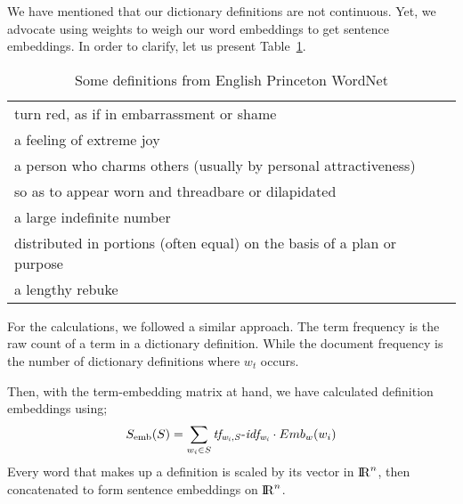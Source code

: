 We have mentioned that our dictionary definitions are not continuous.
Yet, we advocate using \tfidf{} weights to weigh our word embeddings to get sentence embeddings.
In order to clarify, let us present Table~\ref{tab:en_it_examples}.

\noindent{}%

\begin{table}
    \centering
    \caption{Some definitions from English Princeton WordNet}%
    \label{tab:en_it_examples}
    \begin{tabular}{l}
        \toprule
        turn red, as if in embarrassment or shame \\
        a feeling of extreme joy \\
        a person who charms others (usually by personal attractiveness) \\
        so as to appear worn and threadbare or dilapidated \\
        a large indefinite number \\
        distributed in portions (often equal) on the basis of a plan or purpose \\
        a lengthy rebuke \\
        \bottomrule
    \end{tabular}
\end{table}

For the \tfidf{} calculations, we followed a similar approach.
The term frequency is the raw count of a term in a dictionary definition.
While the document frequency is the number of dictionary definitions where $w_t$ occurs.

Then, with the term-embedding matrix at hand, we have calculated definition embeddings using;
\begin{equation}
    S_{\text{emb}}(S) = \sum_{w_{i} \in S} {\operatorname{\mathit{tf_{w_{i},S}-idf_{w_i}}}} \cdot Emb_{w}(w_{i})
\end{equation}
Every word that makes up a definition is scaled by its vector in ${\rm I\!R}^n$, then concatenated to form sentence embeddings on ${\rm I\!R}^n$.


